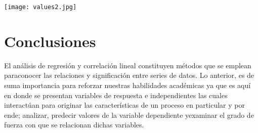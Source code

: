 \documentclass{report}
\begin{document}
 \texttt{[image: values2.jpg]}

 \newpage
\section{Conclusiones}
El análisis de regresión y correlación lineal constituyen métodos que se emplean paraconocer las relaciones y significación entre series de datos. Lo anterior, es de suma importancia para reforzar nuestras habilidades académicas ya que es aquí en donde se presentan variables de respuesta e independientes las cuales interactúan para originar las características de un proceso en particular y por ende; analizar, predecir valores de la variable dependiente yexaminar el grado de fuerza con que se relacionan dichas variables.
\end{document}
